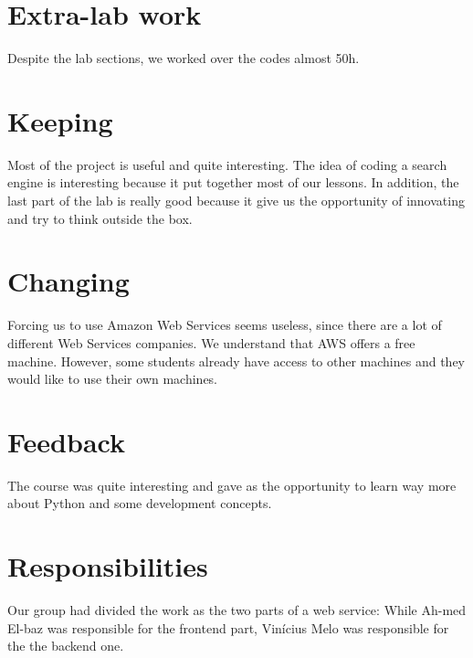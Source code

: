 \documentclass{article}
\begin{document}
\section{Extra-lab work}
Despite the lab sections, we worked over the codes almost 50h.

\section{Keeping}
Most of the project is useful and quite interesting. The idea of coding a search engine is interesting because it put together most of our lessons. In addition, the last part of the lab is really good because it give us the opportunity of innovating and try to think outside the box. 

\section{Changing}
Forcing us to use Amazon Web Services seems useless, since there are a lot of different Web Services companies. We understand that AWS offers a free machine. However, some students already have access to other machines and they would like to use their own machines.

\section{Feedback}
The course was quite interesting and gave as the opportunity to learn way more about Python and some development concepts.

\section{Responsibilities}
Our group had divided the work as the two parts of a web service: While Ah-med El-baz was responsible for the frontend part, Vinícius Melo was responsible for the the backend one.
\end{document}
